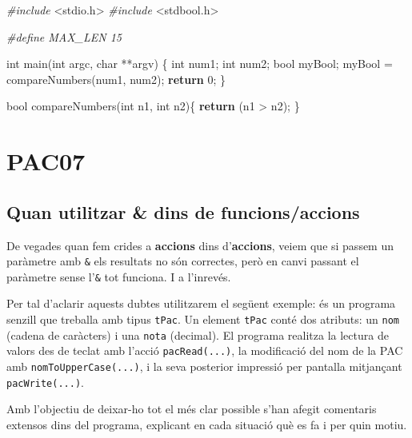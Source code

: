 \documentclass[
]{book}
\newenvironment{Shaded}{\begin{snugshade}}{\end{snugshade}}
\newcommand{\ControlFlowTok}[1]{\textcolor[rgb]{0.13,0.29,0.53}{\textbf{#1}}}
\newcommand{\DataTypeTok}[1]{\textcolor[rgb]{0.13,0.29,0.53}{#1}}
\newcommand{\DecValTok}[1]{\textcolor[rgb]{0.00,0.00,0.81}{#1}}
\newcommand{\ImportTok}[1]{#1}
\newcommand{\NormalTok}[1]{#1}
\newcommand{\PreprocessorTok}[1]{\textcolor[rgb]{0.56,0.35,0.01}{\textit{#1}}}
\begin{document}
\begin{Shaded}
\begin{Highlighting}[]
\PreprocessorTok{\#include }\ImportTok{\textless{}stdio.h\textgreater{}}
\PreprocessorTok{\#include }\ImportTok{\textless{}stdbool.h\textgreater{}}

\PreprocessorTok{\#define MAX\_LEN 15}

\DataTypeTok{int}\NormalTok{ main(}\DataTypeTok{int}\NormalTok{ argc, }\DataTypeTok{char}\NormalTok{ **argv) \{}
    \DataTypeTok{int}\NormalTok{ num1;}
    \DataTypeTok{int}\NormalTok{ num2;}
    \DataTypeTok{bool}\NormalTok{ myBool;}
\NormalTok{    myBool = compareNumbers(num1, num2);}
    \ControlFlowTok{return} \DecValTok{0}\NormalTok{;}
\NormalTok{\}}

\DataTypeTok{bool}\NormalTok{ compareNumbers(}\DataTypeTok{int}\NormalTok{ n1, }\DataTypeTok{int}\NormalTok{ n2)\{}
    \ControlFlowTok{return}\NormalTok{ (n1 \textgreater{} n2); }
\NormalTok{\}}
\end{Highlighting}
\end{Shaded}

\hypertarget{pac07}{%
\chapter{PAC07}\label{pac07}}

\hypertarget{quan-utilitzar-dins-de-funcionsaccions}{%
\section{Quan utilitzar \& dins de funcions/accions}\label{quan-utilitzar-dins-de-funcionsaccions}}

De vegades quan fem crides a \textbf{accions} dins d'\textbf{accions}, veiem que si passem un paràmetre amb \texttt{\&} els resultats no són correctes, però en canvi passant el paràmetre sense l'\texttt{\&} tot funciona. I a l'inrevés.

Per tal d'aclarir aquests dubtes utilitzarem el següent exemple: és un programa senzill que treballa amb tipus \texttt{tPac}. Un element \texttt{tPac} conté dos atributs: un \texttt{nom} (cadena de caràcters) i una \texttt{nota} (decimal). El programa realitza la lectura de valors des de teclat amb l'acció \texttt{pacRead(...)}, la modificació del nom de la PAC amb \texttt{nomToUpperCase(...)}, i la seva posterior impressió per pantalla mitjançant \texttt{pacWrite(...)}.

Amb l'objectiu de deixar-ho tot el més clar possible s'han afegit comentaris extensos dins del programa, explicant en cada situació què es fa i per quin motiu.
\end{document}
